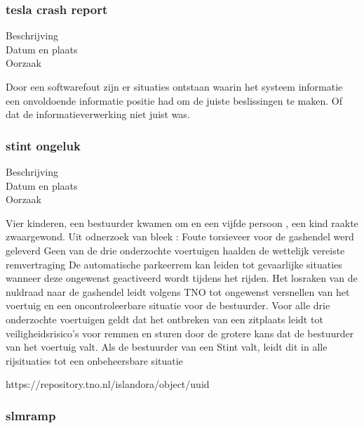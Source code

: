 \subsubsection{tesla crash report}

	\begin{description}
	\item[Beschrijving]
	\item[Datum en plaats] 
	\item[Oorzaak]
\end{description}
Door een softwarefout zijn er situaties ontstaan waarin het systeem informatie een onvoldoende informatie positie had om de juiste beslissingen te maken. Of dat de informatieverwerking niet juist was.




\subsubsection{stint ongeluk}

	\begin{description}
	\item[Beschrijving]
	\item[Datum en plaats] 
	\item[Oorzaak]
\end{description}
Vier kinderen, een bestuurder kwamen om en een vijfde persoon , een kind raakte zwaargewond. Uit odnerzoek van bleek :
Foute torsieveer voor de gashendel werd geleverd
Geen van de drie onderzochte voertuigen haalden de wettelijk vereiste remvertraging
De automatische parkeerrem kan leiden tot gevaarlijke situaties wanneer deze ongewenst geactiveerd wordt tijdens het rijden. 
Het losraken van de nuldraad naar de gashendel leidt volgens TNO tot ongewenst versnellen van het voertuig en een oncontroleerbare situatie voor de bestuurder.
Voor alle drie onderzochte voertuigen geldt dat het ontbreken van een zitplaats leidt tot veiligheidsrisico’s voor remmen en sturen door de grotere kans dat de bestuurder van het voertuig valt. Als de bestuurder van een Stint valt, leidt dit in alle rijsituaties tot een onbeheersbare situatie


https://repository.tno.nl/islandora/object/uuid%




\subsubsection{slmramp}

